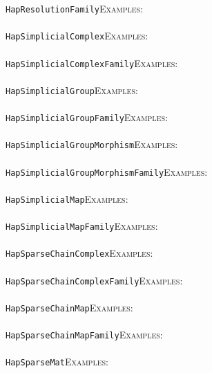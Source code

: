 \documentclass[a4paper,11pt]{report}
\begin{document}
{{ \texttt{HapResolutionFamily}{\nobreakspace}{\nobreakspace}{\nobreakspace}{\nobreakspace}\textsc{Examples:} \\
 \\
 \texttt{HapSimplicialComplex}{\nobreakspace}{\nobreakspace}{\nobreakspace}{\nobreakspace}\textsc{Examples:} \\
 \\
 \texttt{HapSimplicialComplexFamily}{\nobreakspace}{\nobreakspace}{\nobreakspace}{\nobreakspace}\textsc{Examples:} \\
 \\
 \texttt{HapSimplicialGroup}{\nobreakspace}{\nobreakspace}{\nobreakspace}{\nobreakspace}\textsc{Examples:} \\
 \\
 \texttt{HapSimplicialGroupFamily}{\nobreakspace}{\nobreakspace}{\nobreakspace}{\nobreakspace}\textsc{Examples:} \\
 \\
 \texttt{HapSimplicialGroupMorphism}{\nobreakspace}{\nobreakspace}{\nobreakspace}{\nobreakspace}\textsc{Examples:} \\
 \\
 \texttt{HapSimplicialGroupMorphismFamily}{\nobreakspace}{\nobreakspace}{\nobreakspace}{\nobreakspace}\textsc{Examples:} \\
 \\
 \texttt{HapSimplicialMap}{\nobreakspace}{\nobreakspace}{\nobreakspace}{\nobreakspace}\textsc{Examples:} \\
 \\
 \texttt{HapSimplicialMapFamily}{\nobreakspace}{\nobreakspace}{\nobreakspace}{\nobreakspace}\textsc{Examples:} \\
 \\
 \texttt{HapSparseChainComplex}{\nobreakspace}{\nobreakspace}{\nobreakspace}{\nobreakspace}\textsc{Examples:} \\
 \\
 \texttt{HapSparseChainComplexFamily}{\nobreakspace}{\nobreakspace}{\nobreakspace}{\nobreakspace}\textsc{Examples:} \\
 \\
 \texttt{HapSparseChainMap}{\nobreakspace}{\nobreakspace}{\nobreakspace}{\nobreakspace}\textsc{Examples:} \\
 \\
 \texttt{HapSparseChainMapFamily}{\nobreakspace}{\nobreakspace}{\nobreakspace}{\nobreakspace}\textsc{Examples:} \\
 \\
 \texttt{HapSparseMat}{\nobreakspace}{\nobreakspace}{\nobreakspace}{\nobreakspace}\textsc{Examples:} \\
}}
\end{document}
